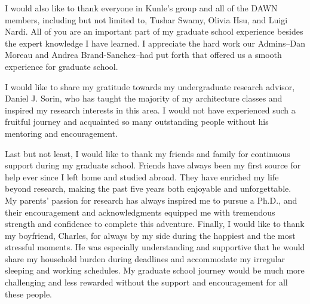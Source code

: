 I would also like to thank everyone in Kunle's group and all of the DAWN members, including but not limited to, 
Tushar Swamy, Olivia Hsu, and Luigi Nardi. 
All of you are an important part of my graduate school experience besides the expert knowledge I
have learned.
I appreciate the hard work our Admins--Dan Moreau and Andrea Brand-Sanchez--had put forth that
offered us a smooth experience for graduate school.

I would like to share my gratitude towards my undergraduate research advisor, Daniel J. Sorin, who has taught the
majority of my architecture classes and inspired my research interests in this area.
I would not have experienced such a fruitful journey and acquainted so many outstanding people
without his mentoring and encouragement.

Last but not least, I would like to thank my friends and family for continuous support during my
graduate school. 
Friends have always been my first source for help ever since I left home and studied abroad.
They have enriched my life beyond research, making the past five years both enjoyable and
unforgettable.
My parents' passion for research has always inspired me to pursue a Ph.D., and their encouragement and
acknowledgments equipped me with tremendous strength and confidence to complete this adventure.
Finally, I would like to thank my boyfriend, Charles, for always by my side during the happiest and the most stressful moments. 
He was especially understanding and supportive that he would
share my household burden during deadlines and accommodate my irregular sleeping and working schedules.
My graduate school journey would be much more challenging and less rewarded without the support and
encouragement for all these people.
